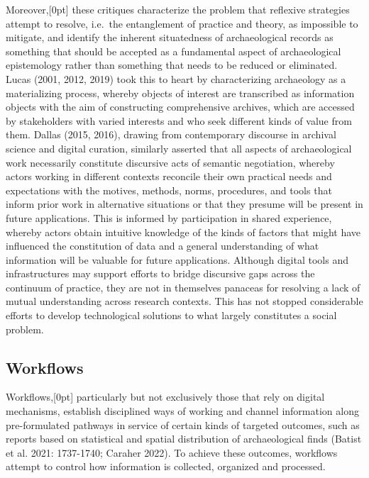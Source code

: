 \documentclass[
]{article}
\newcommand{\paragraphnumber}[1]{\marginnote{\color{lightgray}\tiny{#1}}[0pt]}
\begin{document}
Moreover,\paragraphnumber{[13]} these critiques characterize the problem
that reflexive strategies attempt to resolve, i.e.~the entanglement of
practice and theory, as impossible to mitigate, and identify the
inherent situatedness of archaeological records as something that should
be accepted as a fundamental aspect of archaeological epistemology
rather than something that needs to be reduced or eliminated. Lucas
(2001, 2012, 2019) took this to heart by characterizing archaeology as a
materializing process, whereby objects of interest are transcribed as
information objects with the aim of constructing comprehensive archives,
which are accessed by stakeholders with varied interests and who seek
different kinds of value from them. Dallas (2015, 2016), drawing from
contemporary discourse in archival science and digital curation,
similarly asserted that all aspects of archaeological work necessarily
constitute discursive acts of semantic negotiation, whereby actors
working in different contexts reconcile their own practical needs and
expectations with the motives, methods, norms, procedures, and tools
that inform prior work in alternative situations or that they presume
will be present in future applications. This is informed by
participation in shared experience, whereby actors obtain intuitive
knowledge of the kinds of factors that might have influenced the
constitution of data and a general understanding of what information
will be valuable for future applications. Although digital tools and
infrastructures may support efforts to bridge discursive gaps across the
continuum of practice, they are not in themselves panaceas for resolving
a lack of mutual understanding across research contexts. This has not
stopped considerable efforts to develop technological solutions to what
largely constitutes a social problem.

\subsection{Workflows}\label{workflows}

Workflows,\paragraphnumber{[14]} particularly but not exclusively those
that rely on digital mechanisms, establish disciplined ways of working
and channel information along pre-formulated pathways in service of
certain kinds of targeted outcomes, such as reports based on statistical
and spatial distribution of archaeological finds (Batist et al. 2021:
1737-1740; Caraher 2022). To achieve these outcomes, workflows attempt
to control how information is collected, organized and processed.
\end{document}
